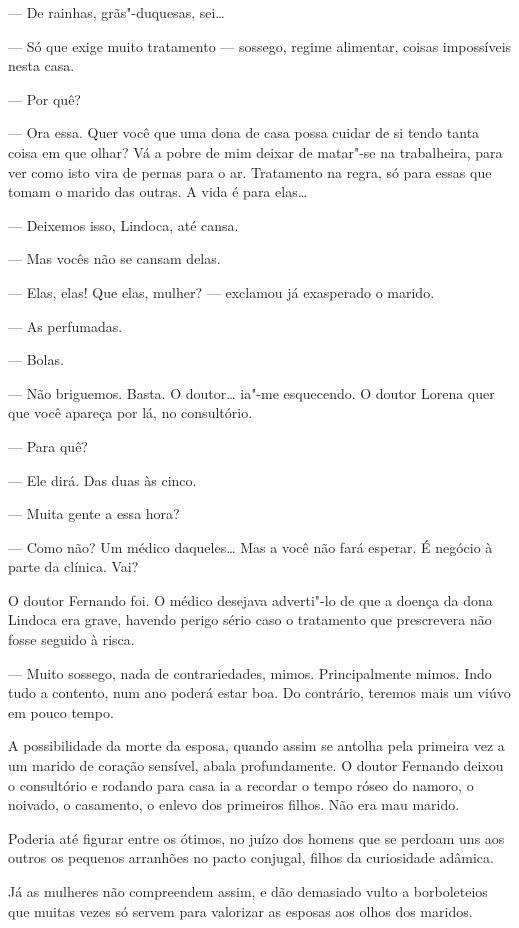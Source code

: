 --- De rainhas, grãs"-duquesas, sei\ldots{}

--- Só que exige muito tratamento --- sossego, regime alimentar, coisas
impossíveis nesta casa.

--- Por quê?

--- Ora essa. Quer você que uma dona de casa possa cuidar de si tendo
tanta coisa em que olhar? Vá a pobre de mim deixar de matar"-se na
trabalheira, para ver como isto vira de pernas para o ar. Tratamento na
regra, só para essas que tomam o marido das outras. A vida é para
elas\ldots{}

--- Deixemos isso, Lindoca, até cansa.

--- Mas vocês não se cansam delas.

--- Elas, elas! Que elas, mulher? --- exclamou já exasperado o marido.

--- As perfumadas.

--- Bolas.

--- Não briguemos. Basta. O doutor\ldots{} ia"-me esquecendo. O doutor Lorena
quer que você apareça por lá, no consultório.

--- Para quê?

--- Ele dirá. Das duas às cinco.

--- Muita gente a essa hora?

--- Como não? Um médico daqueles\ldots{} Mas a você não fará esperar. É
negócio à parte da clínica. Vai?

O doutor Fernando foi. O médico desejava adverti"-lo de que a doença da
dona Lindoca era grave, havendo perigo sério caso o tratamento que
prescrevera não fosse seguido à risca.

--- Muito sossego, nada de contrariedades, mimos. Principalmente mimos.
Indo tudo a contento, num ano poderá estar boa. Do contrário, teremos
mais um viúvo em pouco tempo.

A possibilidade da morte da esposa, quando assim se antolha pela
primeira vez a um marido de coração sensível, abala profundamente. O
doutor Fernando deixou o consultório e rodando para casa ia a recordar o
tempo róseo do namoro, o noivado, o casamento, o enlevo dos primeiros
filhos. Não era mau marido.

Poderia até figurar entre os ótimos, no juízo dos homens que se perdoam
uns aos outros os pequenos arranhões no pacto conjugal, filhos da
curiosidade adâmica.

Já as mulheres não compreendem assim, e dão demasiado vulto a
borboleteios que muitas vezes só servem para valorizar as esposas aos
olhos dos maridos.

